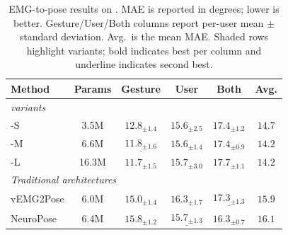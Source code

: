 \begin{table}[t]
\centering
\caption{EMG-to-pose results on \dataset{}. MAE is reported in degrees; lower is better. Gesture/User/Both columns report per-user mean $\pm$ standard deviation. Avg.\ is the mean MAE. Shaded rows highlight \model{} variants; bold indicates best per column and underline indicates second best.}
\label{tab:egoemg_emg_results}
\footnotesize
\setlength{\tabcolsep}{3.8pt}
\renewcommand{\arraystretch}{1.08}
\begin{tabular}{lccccc}
\toprule
Method & Params & Gesture & User & Both & Avg. \\
\midrule
\multicolumn{6}{l}{\textit{\model{} variants}} \\
\midrule
\model{}-S & 3.5M & $12.8_{\pm1.4}$ & $\mathbf{15.6_{\pm2.5}}$ & $17.4_{\pm1.2}$ & $\underline{14.7}$ \\
\rowcolor{green!8}
\model{}-M & 6.6M & $\underline{11.8_{\pm1.6}}$ & $\mathbf{15.6_{\pm1.4}}$ & $17.4_{\pm0.9}$ & $\mathbf{14.2}$ \\
\model{}-L & 16.3M & $\mathbf{11.7_{\pm1.5}}$ & $15.7_{\pm3.0}$ & $17.7_{\pm1.1}$ & $\mathbf{14.2}$ \\
\midrule
\multicolumn{6}{l}{\textit{Traditional architectures}} \\
\midrule
vEMG2Pose & 6.0M & $15.0_{\pm1.4}$ & $16.3_{\pm1.7}$ & $\underline{17.3_{\pm1.3}}$ & $15.9$ \\
NeuroPose & 6.4M & $15.8_{\pm1.2}$ & $\underline{15.7_{\pm1.3}}$ & $\mathbf{16.3_{\pm0.7}}$ & $16.1$ \\
\bottomrule
\end{tabular}
\end{table}